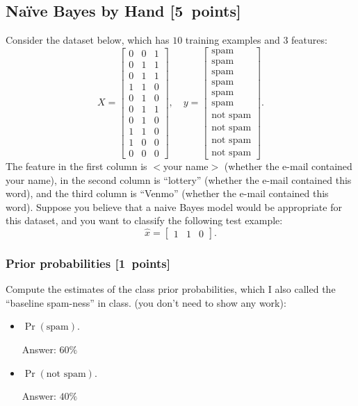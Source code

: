 \documentclass{article}
\newcommand{\blu}[1]{{\textcolor{blu}{#1}}}
\newenvironment{answer}{\par\begingroup\color{gre}Answer: }{\endgroup}
\let\ask\blu
\newcommand\pts[1]{\textcolor{pointscolour}{[#1~points]}}
\begin{document}
    \subsection{Na\"ive Bayes by Hand \pts{5}}

    Consider the dataset below, which has $10$ training examples and $3$ features:
    \[
    X = \begin{bmatrix}
        0 & 0 & 1\\
        0 & 1 & 1\\
        0 & 1 & 1\\
        1 & 1 & 0\\
        0 & 1 & 0\\
        0 & 1 & 1\\
        0 & 1 & 0\\
        1 & 1 & 0\\
        1 & 0 & 0\\
        0 & 0 & 0
    \end{bmatrix},
    \quad y = \begin{bmatrix}
        \text{spam}\\
        \text{spam}\\
        \text{spam}\\
        \text{spam}\\
        \text{spam}\\
        \text{spam}\\
        \text{not spam}\\
        \text{not spam}\\
        \text{not spam}\\
        \text{not spam}
    \end{bmatrix}.
    \]
    The feature in the first column is $<$your name$>$ (whether the e-mail contained your name), in the second column is ``lottery'' (whether the e-mail contained this word), and the third column is ``Venmo'' (whether the e-mail contained this word).
    Suppose you believe that a naive Bayes model would be appropriate for this dataset, and you want to classify the following test example:
    \[
    \hat{x} = \begin{bmatrix}1 & 1 & 0\end{bmatrix}.
    \]

    \subsubsection{Prior probabilities \pts{1}}
    \ask{Compute the estimates of the class prior probabilities, which I also called the ``baseline spam-ness'' in class.} (you don't need to show any work):
    \begin{itemize}
        \item $\Pr(\text{spam})$.
        \begin{answer}
            $60\%$
        \end{answer}
        \item $\Pr(\text{not spam})$.
        \begin{answer}
            $40\%$
        \end{answer}
    \end{itemize}
\end{document}
